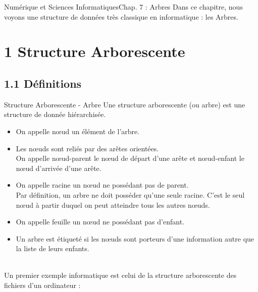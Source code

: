 \documentclass[11pt,a4paper,french,twoside]{PMCours}
\begin{document}
{Numérique et Sciences Informatiques}{Chap. 7 : Arbres}
\vskip -9mm 
Dans ce chapitre, nous voyons une structure de données très classique en informatique : 
les Arbres. 
\section*{\vskip -10mm 1 Structure Arborescente}
\subsection*{\vskip -6mm 1.1 Définitions}
\begin{Definition}{Structure Arborescente - Arbre}
Une {\color{red}structure arborescente} (ou {\color{red}arbre}) est une structure de donnée hiérarchisée.
\begin{itemize}
\item On appelle {\color{red}nœud} un élément de l'arbre.
\item Les {\color{red}nœuds} sont reliés par des arêtes orientées. \\
On appelle {\color{red}nœud-parent} le nœud de départ d'une arête et {\color{red}nœud-enfant} le nœud d'arrivée d'une arête.
\item On appelle {\color{red}racine} un nœud ne possédant pas de parent.\\ 
Par définition, un arbre ne doit posséder qu'une seule racine. C'est le seul nœud à partir duquel on peut atteindre tous les autres nœuds.
\item On appelle {\color{red}feuille} un nœud ne possédant pas d'enfant.  
\item Un arbre est {\color{red} étiqueté} si les nœuds sont porteurs d'une information autre que la liste de leurs enfants.
\end{itemize}
\end{Definition}
\\
Un premier exemple informatique est celui de la structure arborescente des fichiers d'un ordinateur : 
\end{document}
